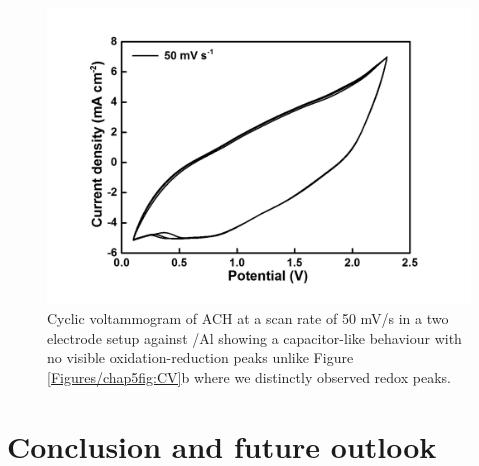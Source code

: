 \begin{figure}[tbh!]
  \centering
  \includegraphics[width=\textwidth]{Figures/chap5fig/hair50mVs}
    \caption{Cyclic voltammogram of ACH at a scan rate of 50 mV/s in a two electrode setup against /Al showing a capacitor-like behaviour with no visible oxidation-reduction peaks unlike Figure \ref{Figures/chap5fig:CV}b where we distinctly observed redox peaks.}
  \label{Figures/chap5fig:hair50mVs}
\end{figure}
\section{Conclusion and future outlook}

